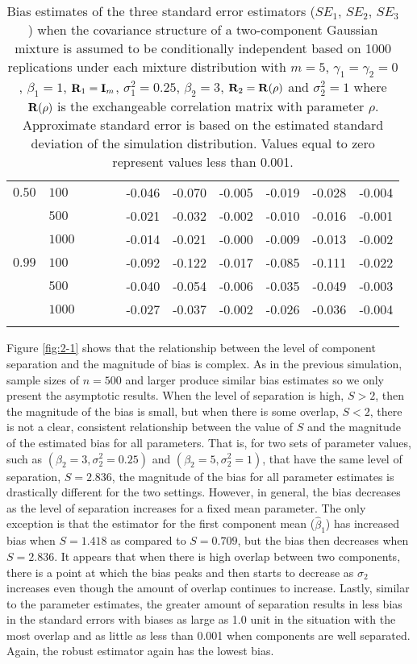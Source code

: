 \begin{landscape}
\begin{table}[ht]
\begin{tabular}{llccccccccc}
  $0.50$ & $100$ &   &   &   & -0.046 & -0.070 & -0.005 & -0.019 & -0.028 & -0.004 \\ 
    & $500$ &   &   &   & -0.021 & -0.032 & -0.002 & -0.010 & -0.016 & -0.001 \\ 
    & $1000$ &   &   &   & -0.014 & -0.021 & -0.000 & -0.009 & -0.013 & -0.002 \\ 
  $0.99$ & $100$ &   &   &   & -0.092 & -0.122 & -0.017 & -0.085 & -0.111 & -0.022 \\ 
    & $500$ &   &   &   & -0.040 & -0.054 & -0.006 & -0.035 & -0.049 & -0.003 \\ 
    & $1000$ &   &   &   & -0.027 & -0.037 & -0.002 & -0.026 & -0.036 & -0.004 \\ 
   \thickhline\end{tabular}
\caption{Bias estimates of the three standard error estimators ($SE_1$, $SE_2$, $SE_3$) when the covariance structure of a two-component Gaussian mixture is assumed to be conditionally independent based on 1000 replications under each mixture distribution with $m=5$, $\gamma_1=\gamma_2=0$, $\beta_{1}=1$, $\mathbf R_1=\mathbf I_{m}$, $\sigma_1^{2}=0.25$, $\beta_2=3$, $\mathbf R_2=\mathbf R(\rho)$ and $\sigma_2^{2}=1$ where $\mathbf R(\rho)$ is the exchangeable correlation matrix with parameter $\rho$. Approximate standard error is based on the estimated standard deviation of the simulation distribution. Values equal to zero represent values less than 0.001.}
\label{tab:dep2}

\end{table}
\end{landscape}
Figure \ref{fig:2-1} shows that the relationship between the level of component separation and the magnitude of bias is complex. As in the previous simulation, sample sizes of $n=500$ and larger produce similar bias estimates so we only present the asymptotic results. When the level of separation is high, $S>2$, then the magnitude of the bias is small, but when there is some overlap, $S<2$, there is not a clear, consistent relationship between the value of $S$ and the magnitude of the estimated bias for all parameters. That is, for two sets of parameter values, such as $(\beta_{2}=3,\sigma^{2}_{2}=0.25)$ and $(\beta_{2}=5,\sigma^{2}_{2}=1)$, that have the same level of separation, $S = 2.836$, the magnitude of the bias for all parameter estimates is drastically different for the two settings. However, in general, the bias decreases as the level of separation increases for a fixed mean parameter. The only exception is that the estimator for the first component mean ($\widehat{\beta}_{1}$) has increased bias when $S=1.418$ as compared to $S=0.709$, but the bias then decreases when $S=2.836$. It appears that when there is high overlap between two components, there is a point at which the bias peaks and then starts to decrease as $\sigma_2$ increases even though the amount of overlap continues to increase. Lastly, similar to the parameter estimates, the greater amount of separation results in less bias in the standard errors with biases as large as 1.0 unit in the situation with the most overlap and as little as less than 0.001 when components are well separated. Again, the robust estimator again has the lowest bias. 
